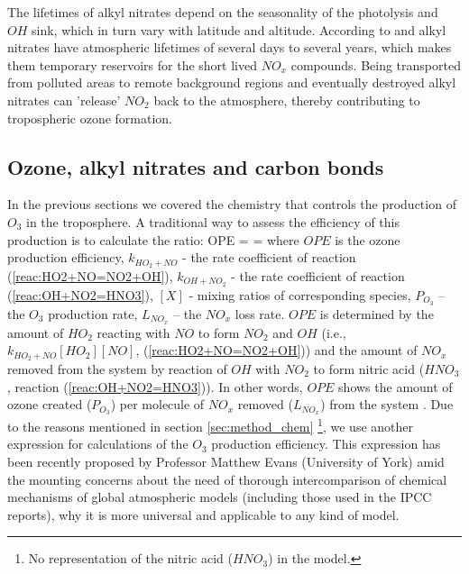 \documentclass[11pt,a4paper]{article}
\newcounter{matriz}
\newenvironment{matriz}{\refstepcounter{matriz}\equation}{\tag{\thematriz}\endequation}
\begin{document}
The lifetimes of alkyl nitrates depend on the seasonality of the photolysis and $OH$ sink, which in turn vary with latitude and altitude. According to \cite{Clemitshaw1997} and \cite{Turberg1990} alkyl nitrates have atmospheric lifetimes of several days to several years, which makes them temporary reservoirs for the short lived $NO_x$ compounds. Being transported from polluted areas to remote background regions and eventually destroyed alkyl nitrates can 'release' $NO_2$ back to the atmosphere, thereby contributing to tropospheric ozone formation.

\subsection{Ozone, alkyl nitrates and carbon bonds}\label{sec:intro_CB}
In the previous sections we covered the chemistry that controls the production of $O_3$ in the troposphere. A traditional way to assess the efficiency of this production is to calculate the ratio:
\begin{matriz}\label{eq:OPE}
OPE =  = 
\end{matriz}
where $OPE$ is the ozone production efficiency, $k_{HO_2+NO}$ - the rate coefficient of reaction (\ref{reac:HO2+NO=NO2+OH}), $k_{OH+NO_2}$ - the rate coefficient of reaction (\ref{reac:OH+NO2=HNO3}), $[X]$ - mixing ratios of corresponding species, $P_{O_3}$ – the $O_3$ production rate, $L_{NO_x}$ – the $NO_x$ loss rate. $OPE$ is determined by the amount of $HO_2$ reacting with $NO$ to form $NO_2$ and $OH$ (i.e., $k_{HO_2+NO}[HO_2][NO]$, (\ref{reac:HO2+NO=NO2+OH})) and the amount of $NO_x$ removed from the system by reaction of $OH$ with $NO_2$ to form nitric acid ($HNO_3$, reaction (\ref{reac:OH+NO2=HNO3})). In other words, $OPE$ shows the amount of ozone created ($P_{O_3}$) per molecule of $NO_x$ removed ($L_{NO_x}$) from the system \citep{Jacob1999}. Due to the reasons mentioned in section \ref{sec:method_chem} \footnote{No representation of the nitric acid ($HNO_3$) in the model.}, we use another expression for calculations of the $O_3$ production efficiency. This expression has been recently proposed by Professor Matthew Evans (University of York) amid the mounting concerns about the need of thorough intercomparison of chemical mechanisms of global atmospheric models (including those used in the IPCC reports), why it is more universal and applicable to any kind of model.
\end{document}
